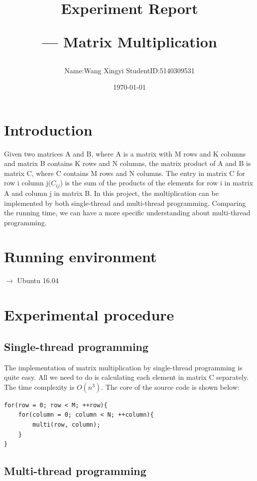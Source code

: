 \documentclass[a4paper, 11pt]{article}
\title{Experiment Report \\ \begin{large}--- Matrix Multiplication\end{large}}
\author{Name:Wang Xingyi StudentID:5140309531}
\date{\today}
\begin{document}
\maketitle
\section{Introduction}
Given two matrices A and B, where A is a matrix with M rows and K columns and matrix B contains K rows and N columns, the matrix product of A and B is matrix C, where C contains M rows and N columns. The entry in matrix C for row i column j($C_{ij}$) is the sum of the products of the elements for row i in matrix A and column j in matrix B. In this project, the multiplication can be implemented by both single-thread and multi-thread programming. Comparing the running time, we can have a more specific understanding about multi-thread programming.
\section{Running environment}
$\longrightarrow$ Ubuntu 16.04
\section{Experimental procedure}
\subsection{Single-thread programming}
The implementation of matrix multiplication by single-thread programming is quite easy. All we need to do is calculating each element in matrix C separately. The time complexity is $O(n^3)$. The core of the source code is shown below:
\begin{lstlisting}
for(row = 0; row < M; ++row){
    for(column = 0; column < N; ++column){
        multi(row, column);
    }
}
\end{lstlisting}
\subsection{Multi-thread programming}
\end{document}
